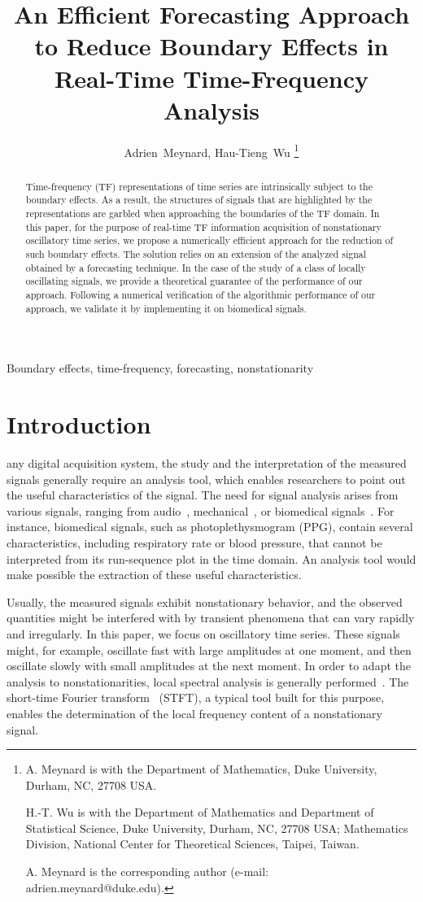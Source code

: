 \documentclass[journal]{IEEEtran}
\title{An Efficient Forecasting Approach\\ to Reduce Boundary Effects in Real-Time Time-Frequency Analysis}
\author{Adrien~Meynard, %
        Hau-Tieng~Wu
\thanks{A. Meynard is with the Department
of Mathematics, Duke University, Durham,
NC, 27708 USA.

H.-T. Wu is with the Department of Mathematics and Department of Statistical Science, Duke University, Durham, NC, 27708 USA; Mathematics Division, National Center for Theoretical Sciences, Taipei, Taiwan.
 
A. Meynard is the corresponding author (e-mail: adrien.meynard@duke.edu).
}}
\begin{document}
\maketitle

\begin{abstract}
Time-frequency (TF) representations of time series are intrinsically subject to the boundary effects. As a result, the structures of signals that are highlighted by the representations are garbled when approaching the boundaries of the TF domain. In this paper, for the purpose of real-time TF information acquisition of nonstationary oscillatory time series, we propose a numerically efficient approach for the reduction of such boundary effects. The solution relies on an extension of the analyzed signal obtained by a forecasting technique. In the case of the study of a class of locally oscillating signals, we provide a theoretical guarantee of the performance of our approach. Following a numerical verification of the algorithmic performance of our approach, we validate it by implementing it on biomedical signals.
\end{abstract}

\begin{IEEEkeywords}
Boundary effects, time-frequency, forecasting, nonstationarity
\end{IEEEkeywords}

\section{Introduction}
\label{se:introduction}
 any digital acquisition system, the study and the interpretation of the measured signals generally require an analysis tool, which enables researchers to point out the useful characteristics of the signal. The need for signal analysis arises from various signals, ranging from audio~\cite{Stowell18computational,Muller11signal}, mechanical~\cite{Peng02vibration}, or biomedical signals~\cite{Akay96detection}. For instance, biomedical signals, such as photoplethysmogram (PPG), contain several characteristics, including respiratory rate or blood pressure, that cannot be interpreted from its run-sequence plot in the time domain. An analysis tool would make possible the extraction of these useful characteristics. 

Usually, the measured signals exhibit nonstationary behavior, and the observed quantities might be interfered with by transient phenomena that can vary rapidly and irregularly. In this paper, we focus on oscillatory time series. These signals might, for example, oscillate fast with large amplitudes at one moment, and then oscillate slowly with small amplitudes at the next moment. In order to adapt the analysis to nonstationarities, local spectral analysis is generally performed~\cite{Stoica05spectral,Matz97generalized}. The short-time Fourier transform~\cite{Grochenig01foundations} (STFT), a typical tool built for this purpose, enables the determination of the local frequency content of a nonstationary signal.
\end{document}
